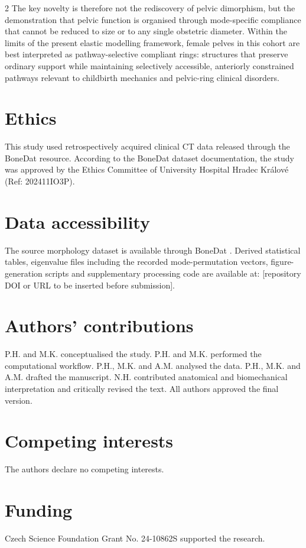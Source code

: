 \documentclass[openacc]{rsproca_new}
\begin{document}
\begin{multicols}{2}
The key novelty is therefore not the rediscovery of pelvic dimorphism, but the demonstration that pelvic function is organised through mode-specific compliance that cannot be reduced to size or to any single obstetric diameter. Within the limits of the present elastic modelling framework, female pelves in this cohort are best interpreted as pathway-selective compliant rings: structures that preserve ordinary support while maintaining selectively accessible, anteriorly constrained pathways relevant to childbirth mechanics and pelvic-ring clinical disorders.

\section*{Ethics}

This study used retrospectively acquired clinical CT data released through the BoneDat resource. According to the BoneDat dataset documentation, the study was approved by the Ethics Committee of University Hospital Hradec Kr\'{a}lov\'{e} (Ref: 202411IO3P).

\section*{Data accessibility}

The source morphology dataset is available through BoneDat \cite{HenysKuchar2025}. Derived statistical tables, eigenvalue files including the recorded mode-permutation vectors, figure-generation scripts and supplementary processing code are available at: [repository DOI or URL to be inserted before submission].

\section*{Authors' contributions}

P.H. and M.K. conceptualised the study. P.H. and M.K. performed the computational workflow. P.H., M.K. and A.M. analysed the data. P.H., M.K. and A.M. drafted the manuscript. N.H. contributed anatomical and biomechanical interpretation and critically revised the text. All authors approved the final version.

\section*{Competing interests}

The authors declare no competing interests.

\section*{Funding}
Czech Science Foundation Grant No. 24-10862S supported the research.
\end{multicols}
\end{document}
